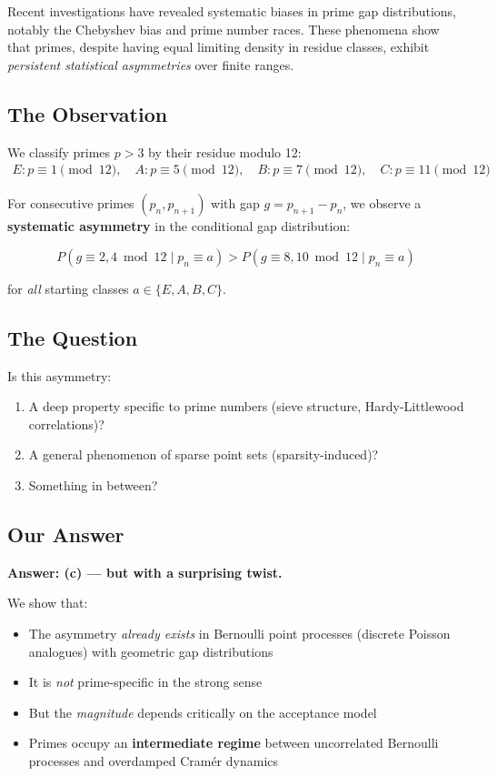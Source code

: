 \documentclass[11pt,a4paper]{article}
\theoremstyle{definition}
\theoremstyle{remark}
\begin{document}
Recent investigations \cite{Rubinstein1994,Granville2006} have revealed systematic biases in prime gap distributions, notably the Chebyshev bias and prime number races. These phenomena show that primes, despite having equal limiting density in residue classes, exhibit \emph{persistent statistical asymmetries} over finite ranges.

\subsection{The Observation}

We classify primes $p > 3$ by their residue modulo 12:
\begin{align*}
E: p \equiv 1 \pmod{12}, \quad
A: p \equiv 5 \pmod{12}, \quad
B: p \equiv 7 \pmod{12}, \quad
C: p \equiv 11 \pmod{12}
\end{align*}

For consecutive primes $(p_n, p_{n+1})$ with gap $g = p_{n+1} - p_n$, we observe a \textbf{systematic asymmetry} in the conditional gap distribution:

\begin{equation}
P(g \equiv 2,4 \bmod 12 \mid p_n \equiv a) > P(g \equiv 8,10 \bmod 12 \mid p_n \equiv a)
\end{equation}

for \emph{all} starting classes $a \in \{E, A, B, C\}$.

\subsection{The Question}

Is this asymmetry:
\begin{enumerate}[label=(\alph*)]
\item A deep property specific to prime numbers (sieve structure, Hardy-Littlewood correlations)?
\item A general phenomenon of sparse point sets (sparsity-induced)?
\item Something in between?
\end{enumerate}

\subsection{Our Answer}

\textbf{Answer: (c) — but with a surprising twist.}

We show that:
\begin{itemize}
\item The asymmetry \emph{already exists} in Bernoulli point processes (discrete Poisson analogues) with geometric gap distributions
\item It is \emph{not} prime-specific in the strong sense
\item But the \emph{magnitude} depends critically on the acceptance model
\item Primes occupy an \textbf{intermediate regime} between uncorrelated Bernoulli processes and overdamped Cramér dynamics
\end{itemize}
\end{document}
